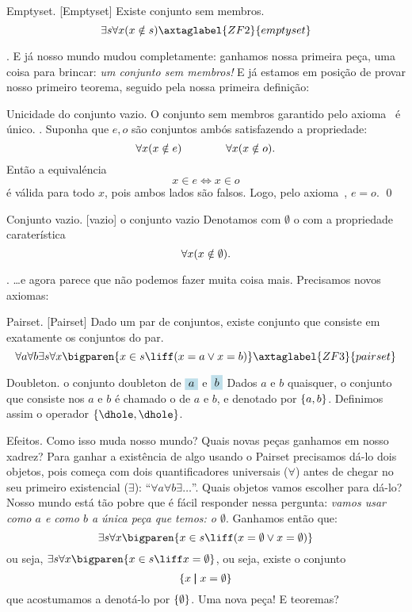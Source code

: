 {%
\axiom Emptyset.
[Emptyset]%
\label{emptyset}%
Existe conjunto sem membros.
$$
\exists s \forall x
\paren{
x \notin s
}
\axtaglabel{ZF2}{emptyset}
$$

\blah.
E já nosso mundo mudou completamente:
ganhamos nossa primeira peça, uma coisa para brincar:
\emph{um conjunto sem membros!}
E já estamos em posição de provar nosso primeiro teorema,
seguido pela nossa primeira definição:

\theorem Unicidade do conjunto vazio.
%
\label{uniqueness_of_emptyset}%
O conjunto sem membros garantido pelo axioma~ é único.
\proof.
Suponha que $e, o$ são conjuntos ambós satisfazendo a propriedade:
$$
\forall x{\left({x \notin e}\right)}
\hskip 4em\relax
\forall x{\left({x \notin o}\right)}.
$$
Então a equivaléncia
$$
x\in e \iff x \in o
$$
é válida para todo $x$, pois ambos lados são falsos.
Logo, pelo axioma~, $e=o$.
\qed

 Conjunto vazio.
\label{emptyset_def}%
[vazio]%
\sdefined {\emptyset} {o conjunto vazio}%
Denotamos com $\emptyset$ o  com a propriedade caraterística
$$
\forall x{\left({x\notin \emptyset}\right)}.
$$

\blah.
\noindent\dots e agora parece que não podemos fazer muita coisa mais.
Precisamos novos axiomas:

\axiom Pairset.
[Pairset]%
\label{pairset}%
Dado um par de conjuntos, existe conjunto que consiste
em exatamente os conjuntos do par.
$$
\forall a
\forall b
\exists s
\forall x
\bigparen{
x\in s
\liff
\paren{
x = a
\lor
x = b
}
}
\axtaglabel{ZF3}{pairset}
$$

 Doubleton.
%
 {o conjunto doubleton de $\holed a$ e $\holed b$}%
Dados $a$ e $b$ quaisquer, o conjunto que consiste nos $a$ e $b$
é chamado o  de $a$ e $b$, e denotado por $\left\{a, b\right\}$.
Definimos assim o operador $\set{\dhole, \dhole}$.

\note Efeitos.
Como isso muda nosso mundo?
Quais novas peças ganhamos em nosso xadrez?
Para ganhar a existência de algo usando o Pairset
precisamos dá-lo dois objetos,
pois começa com dois quantificadores universais ($\forall$) antes de chegar no seu primeiro existencial ($\exists$):
``$\forall a\forall b \exists \dots$''.
Quais objetos vamos escolher para dá-lo?
Nosso mundo está tão pobre que é fácil responder nessa pergunta:
\emph{vamos usar como $a$ e como $b$ a única peça que temos: o $\emptyset$}.
Ganhamos então que:
$$
\exists s \forall x\bigparen { x \in s \liff \paren{ x = \emptyset \lor x = \emptyset }}
$$
ou seja, $\exists s \forall x \bigparen { x \in s \liff x = \emptyset }$,
ou seja, existe o conjunto
$$
\left\{ x \;\mathord{\pmb{\mid}}\; x = \emptyset \right\}
$$
que acostumamos a denotá-lo por $\left\{\emptyset\right\}$.
Uma nova peça!  E teoremas?

}
